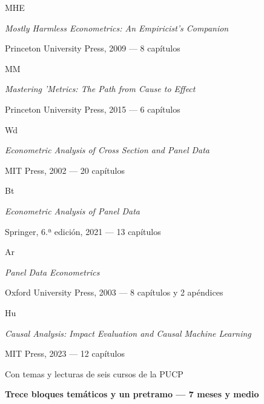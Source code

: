 \documentclass[11pt,a4paper]{article}
\newcommand{\etiqueta}[2]{%
  {\setlength{\fboxsep}{1.4pt}\colorbox{#1}{\sffamily\bfseries\color{white}\strut#2}}}
\begin{document}
\begin{titlepage}
\vspace{0.3cm}
{\large\etiqueta{colorMHE}{MHE} \par}
{\normalsize \emph{\color{colorMHE}Mostly Harmless Econometrics: An Empiricist's Companion}\par}
{\small\color{tonoPizarra} Princeton University Press, 2009 --- 8 capítulos\par}
\vspace{0.12cm}
{\large\etiqueta{colorMM}{MM} \par}
{\normalsize \emph{\color{colorMM}Mastering 'Metrics: The Path from Cause to Effect}\par}
{\small\color{tonoPizarra} Princeton University Press, 2015 --- 6 capítulos\par}
\vspace{0.12cm}
{\large\etiqueta{colorWd}{Wd} \par}
{\normalsize \emph{\color{colorWd}Econometric Analysis of Cross Section and Panel Data}\par}
{\small\color{tonoPizarra} MIT Press, 2002 --- 20 capítulos\par}
\vspace{0.12cm}
{\large\etiqueta{colorBt}{Bt} \par}
{\normalsize \emph{\color{colorBt}Econometric Analysis of Panel Data}\par}
{\small\color{tonoPizarra} Springer, 6.ª edición, 2021 --- 13 capítulos\par}
\vspace{0.12cm}
{\large\etiqueta{colorAr}{Ar} \par}
{\normalsize \emph{\color{colorAr}Panel Data Econometrics}\par}
{\small\color{tonoPizarra} Oxford University Press, 2003 --- 8 capítulos y 2 apéndices\par}
\vspace{0.12cm}
{\large\etiqueta{colorHu}{Hu} \par}
{\normalsize \emph{\color{colorHu}Causal Analysis: Impact Evaluation and Causal Machine Learning}\par}
{\small\color{tonoPizarra} MIT Press, 2023 --- 12 capítulos\par}
\vspace{0.35cm}
{\normalsize\color{colorPUCP} Con temas y lecturas de seis cursos de la PUCP\par}
\vfill
{\setlength{\fboxsep}{6pt}\colorbox{tonoPrincipal}{\normalsize\sffamily\bfseries\color{white} Trece bloques temáticos y un pretramo --- 7 meses y medio}\par}
\vspace{0.2cm}
\end{titlepage}
\end{document}
